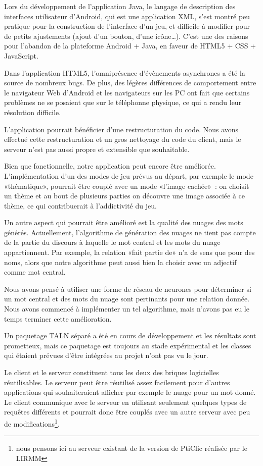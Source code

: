 \documentclass[a4paper,11pt,french]{article}
\def\android{Android\texttrademark{}}
\begin{document}
Lors du développement de l'application Java, le langage de description des interfaces utilisateur d'\android{}, qui est une application XML,
s'est montré peu pratique pour la construction de l'interface d'un jeu, et difficile à modifier pour de petits ajustements (ajout d'un
bouton, d'une icône…). C'est une des raisons pour l'abandon de la plateforme \android{} + Java, en faveur de HTML5 + CSS + JavaScript.

Dans l'application HTML5, l'omniprésence d'évènements asynchrones a été la source de nombreux bugs. De plus, des légères différences de
comportement entre le navigateur Web d'\android{} et les navigateurs sur les PC ont fait que certains problèmes ne se posaient que
sur le téléphonne physique, ce qui a rendu leur résolution difficile.

L'application pourrait bénéficier d'une restructuration du code. Nous avons effectué cette restructuration et un gros
nettoyage du code du client, mais le serveur n'est pas aussi propre et extensible que souhaitable.

Bien que fonctionnelle, notre application peut encore être améliorée. L'implémentation d'un des modes de jeu prévus au départ, par exemple
le mode «thématique», pourrait être couplé avec un mode «l'image cachée»~: on choisit un thème et au bout de plusieurs parties on découvre une
image associée à ce thème, ce qui contribuerait à l'addictivité du jeu.

Un autre aspect qui pourrait être amélioré est la qualité des nuages des mots générés. Actuellement, l'algorithme de génération des nuages ne tient pas
compte de la partie du discours à laquelle le mot central et les mots du nuage appartiennent. Par exemple, la relation «fait partie de» n'a
de sens que pour des noms, alors que notre algorithme peut aussi bien la choisir avec un adjectif comme mot central.

Nous avons pensé à utiliser une forme de réseau de neurones pour déterminer si un mot central et des mots du nuage sont pertinants pour une
relation donnée. Nous avons commencé à implémenter un tel algorithme, mais n'avons pas eu le temps terminer cette amélioration.

Un paquetage TALN séparé a été en cours de développement et les résultats sont prometteux, mais ce paquetage est toujours au stade expérimental et les classes qui étaient prévues d'être intégrées au projet n'ont pas vu le jour.


Le client et le serveur constituent tous les deux des briques logicielles réutilisables. Le serveur peut être réutilisé assez facilement
pour d'autres applications qui souhaiteraient afficher par exemple le nuage pour un mot donné. Le client communique avec le serveur en
utilisant seulement quelques types de requêtes différents et pourrait donc être couplés avec un autre serveur avec peu de modifications\footnote{nous pensons ici au serveur existant de la version de PtiClic réalisée par le LIRMM}.
\end{document}
